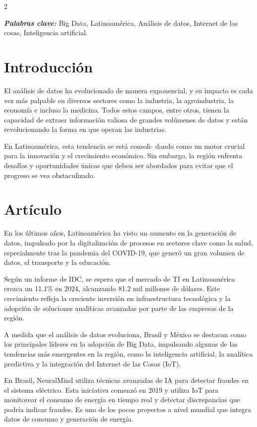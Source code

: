\documentclass[12pt,spanish,Letterpaper,openany]{book}
\begin{document}
\begin {multicols}{2}

\textbf{\emph{Palabras clave:}} Big Data, Latinoamérica, Análisis de datos, Internet de las cosas, Inteligencia artificial.

\hypertarget{introducciuxf3n-11}{%
\section{Introducción}\label{introducciuxf3n-11}}

El análisis de datos ha evolucionado de manera exponencial, y su impacto es cada vez más palpable en diversos sectores como la industria, la agroindustria, la economía e incluso la medicina. Todos estos campos, entre otros, tienen la capacidad de extraer información valiosa de grandes volúmenes de datos y están revolucionando la forma en que operan las industrias.

En Latinoamérica, esta tendencia se está consoli-
dando como un motor crucial para la innovación y el crecimiento económico. Sin embargo, la región enfrenta desafíos y oportunidades únicas que deben ser abordados para evitar que el progreso se vea obstaculizado.

\hypertarget{artuxedculo-11}{%
\section{Artículo}\label{artuxedculo-11}}

En los últimos años, Latinoamérica ha visto un aumento en la generación de datos, impulsado por la digitalización de procesos en sectores clave como la salud, especialmente tras la pandemia del COVID-19, que generó un gran volumen de datos, el transporte y la educación.

Según un informe de IDC, se espera que el mercado de TI en Latinoamérica crezca un 11.1\% en 2024, alcanzando 81.2 mil millones de dólares. Este crecimiento refleja la creciente inversión en infraestructura tecnológica y la adopción de soluciones analíticas avanzadas por parte de las empresas de la región.

A medida que el análisis de datos evoluciona, Brasil y México se destacan como los principales líderes en la adopción de Big Data, impulsando algunas de las tendencias más emergentes en la región, como la inteligencia artificial, la analítica predictiva y la integración del Internet de las Cosas (IoT).

En Brasil, NeuralMind utiliza técnicas avanzadas de IA para detectar fraudes en el sistema eléctrico. Esta iniciativa comenzó en 2019 y utiliza IoT para monitorear el consumo de energía en tiempo real y detectar discrepancias que podría indicar fraudes. Es uno de los pocos proyectos a nivel mundial que integra datos de consumo y generación de energía.


\end{multicols}
\end{document}
